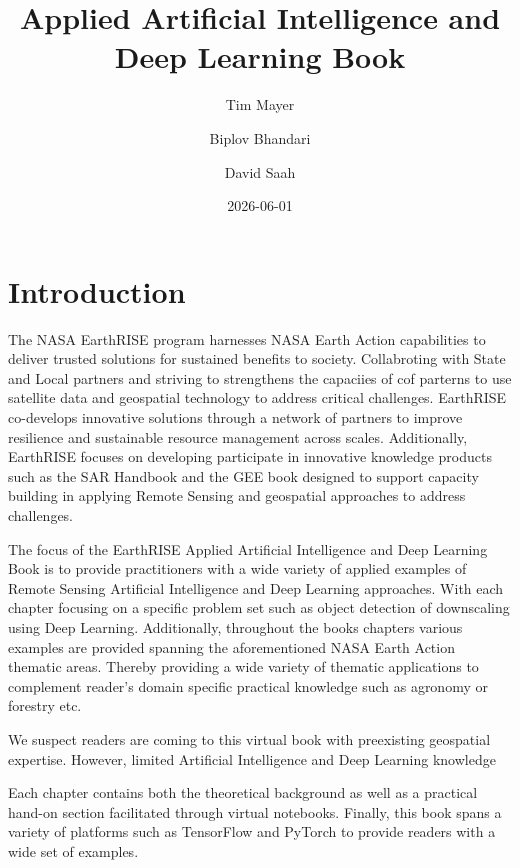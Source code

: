 \documentclass[
  letterpaper,
  DIV=11,
  numbers=noendperiod]{scrreprt}
\title{Applied Artificial Intelligence and Deep Learning Book}
\author{Tim Mayer \and Biplov Bhandari \and David Saah}
\date{2026-06-01}
\renewcommand*\contentsname{Table of contents}
\newcommand\contentsname{Table of contents}
\begin{document}
\maketitle

\renewcommand*\contentsname{Table of contents}
{
\hypersetup{linkcolor=}
\setcounter{tocdepth}{2}
\tableofcontents
}


\chapter*{Introduction}\label{introduction}


The NASA EarthRISE program harnesses NASA Earth Action capabilities to
deliver trusted solutions for sustained benefits to society.
Collabroting with State and Local partners and striving to strengthens
the capaciies of cof parterns to use satellite data and geospatial
technology to address critical challenges. EarthRISE co-develops
innovative solutions through a network of partners to improve resilience
and sustainable resource management across scales. Additionally,
EarthRISE focuses on developing participate in innovative knowledge
products such as the SAR Handbook and the GEE book designed to support
capacity building in applying Remote Sensing and geospatial approaches
to address challenges.

The focus of the EarthRISE Applied Artificial Intelligence and Deep
Learning Book is to provide practitioners with a wide variety of applied
examples of Remote Sensing Artificial Intelligence and Deep Learning
approaches. With each chapter focusing on a specific problem set such as
object detection of downscaling using Deep Learning. Additionally,
throughout the books chapters various examples are provided spanning the
aforementioned NASA Earth Action thematic areas. Thereby providing a
wide variety of thematic applications to complement reader's domain
specific practical knowledge such as agronomy or forestry etc.

We suspect readers are coming to this virtual book with preexisting
geospatial expertise. However, limited Artificial Intelligence and Deep
Learning knowledge

Each chapter contains both the theoretical background as well as a
practical hand-on section facilitated through virtual notebooks.
Finally, this book spans a variety of platforms such as TensorFlow and
PyTorch to provide readers with a wide set of examples.
\end{document}
